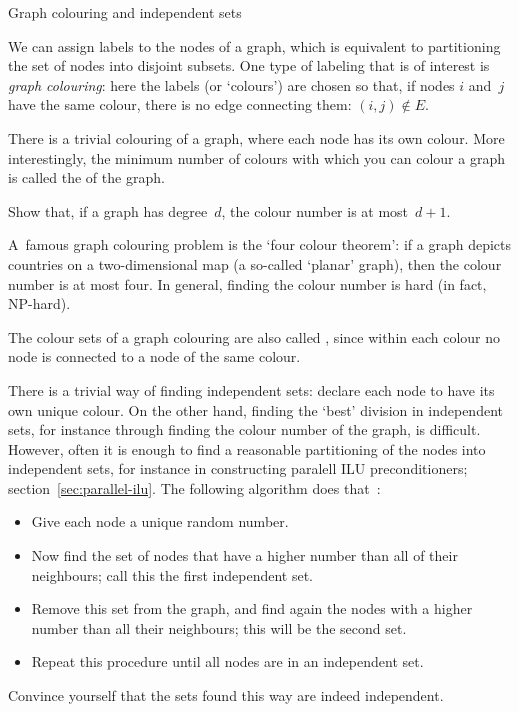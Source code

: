  {Graph colouring and independent sets}
\label{sec:independent}

We can assign labels to the nodes of a graph, which is equivalent to
partitioning the set of nodes into disjoint subsets. One type of
labeling that is of interest is \emph{graph colouring}: here the
labels (or `colours') are chosen so that, if nodes $i$ and~$j$ have
the same colour, there is no edge connecting them: $(i,j)\not\in
E$. 

There is a trivial colouring of a graph, where each node has its own
colour. More interestingly,
the minimum number of colours with which you can colour a graph is
called the  of the graph.

\begin{exercise}
  Show that, if a graph has degree~$d$, the colour number is at
  most~$d+1$.
\end{exercise}

A~famous graph colouring problem is the `four colour theorem': if
a graph depicts countries on a two-dimensional map (a so-called
`planar' graph), then the colour number is at most four.
In general, finding the colour number is hard (in fact, NP-hard).

The colour sets of a graph colouring are also called
, since within each colour no node is
connected to a node of the same colour.

There is a trivial way of finding independent sets: declare each node
to have its own unique colour. On the other hand, finding the `best'
division in independent sets, for instance through finding the colour
number of the graph, is difficult. However, often it is enough to find
a reasonable partitioning of the nodes into independent sets, for
instance in constructing paralell ILU preconditioners;
section~\ref{sec:parallel-ilu}. The following algorithm does
that~\cite{jopl94,Luby:parallel}:
\begin{itemize}
\item Give each node a unique random number.
\item Now find the set of nodes that have a higher number than all of
  their neighbours; call this the first independent set.
\item Remove this set from the graph, and find again the nodes with a
  higher number than all their neighbours; this will be the second
  set.
\item Repeat this procedure until all nodes are in an independent set.
\end{itemize}
\begin{exercise}
  Convince yourself that the sets found this way are indeed independent.
\end{exercise}

